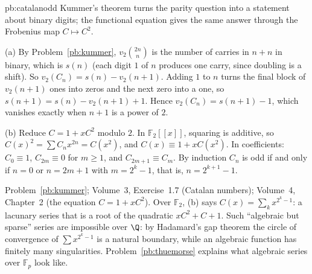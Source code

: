 \begin{solution}{pb:catalanodd}
\idea Kummer's theorem turns the parity question into a statement about binary digits; the functional equation gives the same
answer through the Frobenius map $C\mapsto C^2$.

\writeup (a) By Problem~\ref{pb:kummer}, $v_2\binom{2n}n$ is the number of carries in $n+n$ in binary, which is $s(n)$ (each digit $1$ of
$n$ produces one carry, since doubling is a shift). So $v_2(C_n)=s(n)-v_2(n+1)$. Adding $1$ to $n$ turns the final block of
$v_2(n+1)$ ones into zeros and the next zero into a one, so $s(n+1)=s(n)-v_2(n+1)+1$. Hence $v_2(C_n)=s(n+1)-1$, which vanishes
exactly when $n+1$ is a power of $2$.

(b) Reduce $C=1+xC^2$ modulo $2$. In $\mathbb F_2[[x]]$, squaring is additive, so $C(x)^2=\sum C_nx^{2n}=C(x^2)$, and
$C(x)\equiv1+xC(x^2)$. In coefficients: $C_0\equiv1$, $C_{2m}\equiv0$ for $m\ge1$, and $C_{2m+1}\equiv C_m$. By induction $C_n$ is odd if
and only if $n=0$ or $n=2m+1$ with $m=2^k-1$, that is, $n=2^{k+1}-1$.

\tools Problem~\ref{pb:kummer}; Volume~3, Exercise~1.7 (Catalan numbers); Volume~4, Chapter~2 (the equation $C=1+xC^2$).
\leads Over $\mathbb F_2$, (b) says $C(x)=\sum_kx^{2^k-1}$: a lacunary series that is a root of the quadratic $xC^2+C+1$. Such
``algebraic but sparse'' series are impossible over $\Q$: by Hadamard's gap theorem the circle of convergence of $\sum x^{2^k-1}$ is a
natural boundary, while an algebraic function has finitely many singularities. Problem~\ref{pb:thuemorse} explains what
algebraic series over $\mathbb F_p$ look like.
\end{solution}

